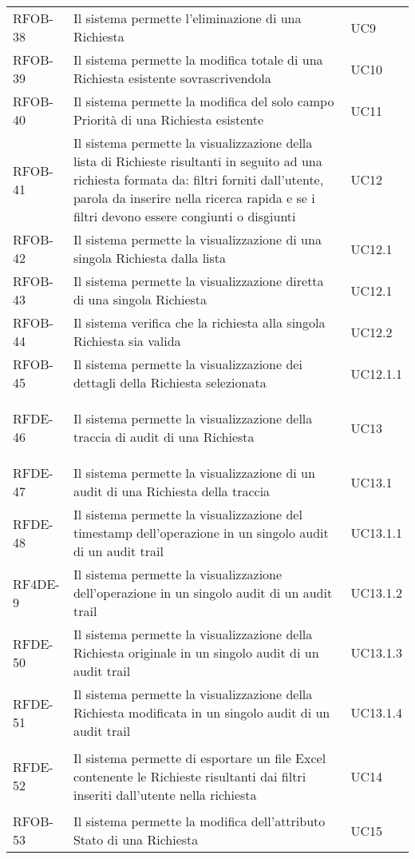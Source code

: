 \begin{center}
\begin{longtable}{p{2.0cm}|p{8cm}|p{2.7cm}}
RFOB-38  & Il sistema permette l'eliminazione di una Richiesta & UC9 \\ 
RFOB-39  & Il sistema permette la modifica totale di una Richiesta esistente sovrascrivendola & UC10 \\ 
RFOB-40  & Il sistema permette la modifica del solo campo Priorità di una Richiesta esistente & UC11 \\ 
RFOB-41  & Il sistema permette la visualizzazione della lista di Richieste risultanti in seguito ad una richiesta formata da: filtri forniti dall'utente, parola da inserire nella ricerca rapida e se i filtri devono essere congiunti o disgiunti & UC12 \\ 
RFOB-42  & Il sistema permette la visualizzazione di una singola Richiesta dalla lista & UC12.1 \\ 
RFOB-43  & Il sistema permette la visualizzazione diretta di una singola Richiesta & UC12.1 \\ 
RFOB-44  & Il sistema verifica che la richiesta alla singola Richiesta sia valida & UC12.2 \\ 
RFOB-45  & Il sistema permette la visualizzazione dei dettagli della Richiesta selezionata & UC12.1.1 \\ 



\hypertarget{rf46}{RFDE-46}  & Il sistema permette la visualizzazione della traccia di audit di una Richiesta & UC13 \\ 
RFDE-47  & Il sistema permette la visualizzazione di un audit di una Richiesta della traccia & UC13.1 \\ 
RFDE-48  & Il sistema permette la visualizzazione del timestamp dell'operazione in un singolo audit di un audit trail & UC13.1.1 \\ 
RF4DE-9  & Il sistema permette la visualizzazione dell'operazione in un singolo audit di un audit trail & UC13.1.2 \\ 
RFDE-50  & Il sistema permette la visualizzazione della Richiesta originale in un singolo audit di un audit trail & UC13.1.3 \\ 
RFDE-51  & Il sistema permette la visualizzazione della Richiesta modificata in un singolo audit di un audit trail & UC13.1.4 \\ 



\hypertarget{rf52}{RFDE-52}  & Il sistema permette di esportare un file Excel contenente le Richieste risultanti dai filtri inseriti dall'utente nella richiesta & UC14 \\ 
RFOB-53  & Il sistema permette la modifica dell'attributo Stato di una Richiesta & UC15 \\ 


\end{longtable}
\end{center}
